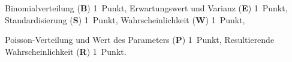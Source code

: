 \begin{bewertung}
\begin{teilaufgaben}
\item
Binomialverteilung ({\bf B}) 1~Punkt,
Erwartungswert und Varianz ({\bf E}) 1~Punkt,
Standardisierung ({\bf S}) 1~Punkt,
Wahrscheinlichkeit ({\bf W}) 1~Punkt,
\item
Poisson-Verteilung und Wert des Parameters ({\bf P}) 1~Punkt,
Resultierende Wahrscheinlichkeit ({\bf R}) 1~Punkt.
\end{teilaufgaben}
\end{bewertung}



